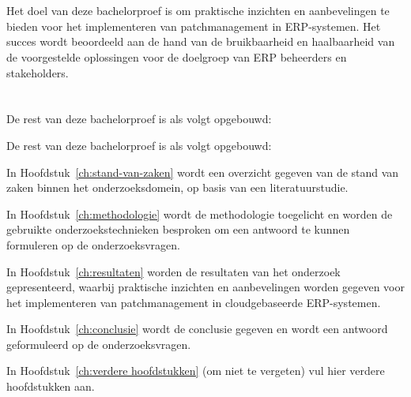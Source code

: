 \section{}%
\label{sec:onderzoeksdoelstelling}

Het doel van deze bachelorproef is om praktische inzichten en aanbevelingen te bieden voor het implementeren van patchmanagement in ERP-systemen. Het succes wordt beoordeeld aan de hand van de bruikbaarheid en haalbaarheid van de voorgestelde oplossingen voor de doelgroep van ERP beheerders en stakeholders.

\section{}%
\label{sec:opzet-bachelorproef}

De rest van deze bachelorproef is als volgt opgebouwd:


De rest van deze bachelorproef is als volgt opgebouwd:

In Hoofdstuk~\ref{ch:stand-van-zaken} wordt een overzicht gegeven van de stand van zaken binnen het onderzoeksdomein, op basis van een literatuurstudie.

In Hoofdstuk~\ref{ch:methodologie} wordt de methodologie toegelicht en worden de gebruikte onderzoekstechnieken besproken om een antwoord te kunnen formuleren op de onderzoeksvragen.

In Hoofdstuk~\ref{ch:resultaten} worden de resultaten van het onderzoek gepresenteerd, waarbij praktische inzichten en aanbevelingen worden gegeven voor het implementeren van patchmanagement in cloudgebaseerde ERP-systemen.

In Hoofdstuk~\ref{ch:conclusie} wordt de conclusie gegeven en wordt een antwoord geformuleerd op de onderzoeksvragen. 

In Hoofdstuk~\ref{ch:verdere hoofdstukken} (om niet te vergeten) vul hier verdere hoofdstukken aan.